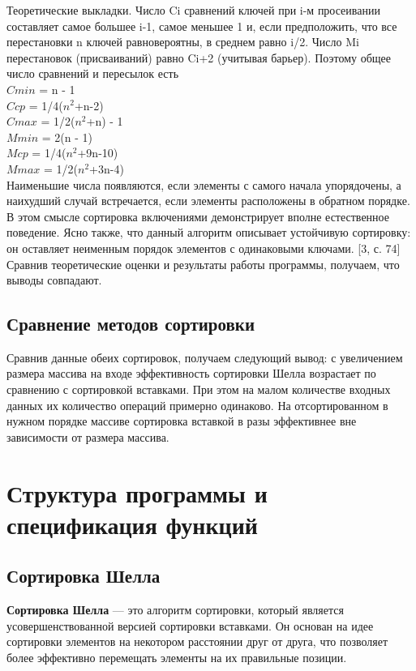 \documentclass[a4paper,12pt,titlepage,finall]{article}
\begin{document}
Теоретические выкладки.
Число Ci сравнений ключей при i-м просеивании составляет самое большее i-1, самое меньшее 1 и, если предположить, что все перестановки n ключей равновероятны, в среднем равно i/2. Число Mi перестановок (присваиваний) равно Ci+2 (учитывая барьер). Поэтому общее число сравнений и пересылок есть \\
$Cmin$ = n - 1 \\
$Ccp$ = 1/4($n^2$+n-2) \\
$Cmax$ = 1/2($n^2$+n) - 1 \\
$Mmin$ = 2(n - 1) \\
$Mcp$ = 1/4($n^2$+9n-10) \\
$Mmax$ = 1/2($n^2$+3n-4) \\
Наименьшие числа появляются, если элементы с самого начала упорядочены, а наихудший случай встречается, если элементы расположены в обратном порядке. В этом смысле сортировка включениями демонстрирует вполне естественное поведение. Ясно также, что данный алгоритм описывает устойчивую сортировку: он оставляет неименным порядок элементов с одинаковыми ключами. [3, с. 74]
\\

Сравнив теоретические оценки и результаты работы программы, получаем, что выводы совпадают.

\subsection{Сравнение методов сортировки}

Сравнив данные обеих сортировок, получаем следующий вывод: с увеличением размера массива на входе эффективность сортировки Шелла возрастает по сравнению с сортировкой вставками. При этом на малом количестве входных данных их количество операций примерно одинаково. На отсортированном в нужном порядке массиве сортировка вставкой в разы эффективнее вне зависимости от размера массива.

\newpage


\section{Структура программы и спецификация функций}


\subsection{Сортировка Шелла}

{\bf Сортировка Шелла} — это алгоритм сортировки, который является усовершенствованной версией сортировки вставками. Он основан на идее сортировки элементов на некотором расстоянии друг от друга, что позволяет более эффективно перемещать элементы на их правильные позиции.
\end{document}
